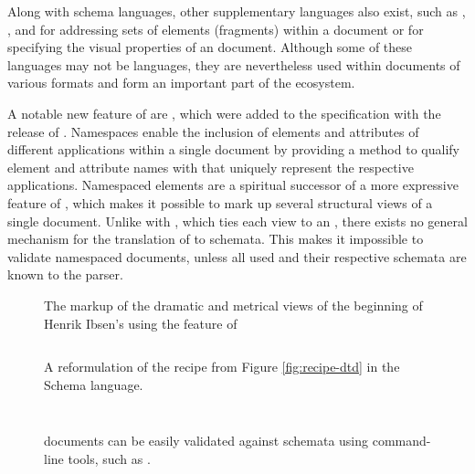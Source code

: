 \documentclass{book}
\begin{document}
Along with schema languages, other supplementary languages also exist, such as
, , and  for addressing sets of elements
(fragments) within a  document or  for specifying the
visual properties of an  document. Although some of these
languages may not be  languages, they are nevertheless used within
documents of various  formats and form an important part of the
ecosystem.

A notable new feature of  are %
, which were added to the specification with the
release of \cite{bray99}. Namespaces enable the inclusion of elements and
attributes of different  applications within a single 
document by providing a method to qualify element and attribute names with
 that uniquely represent the respective  applications.
Namespaced elements are a spiritual successor of a more expressive
 feature of , which makes it possible to
mark up several structural views of a single document. Unlike with
, which ties each view to an  ,
there exists no general mechanism for the translation of  to
 schemata.  This makes it impossible to validate namespaced
 documents, unless all used  and their respective
schemata are known to the parser.

\begin{figure}[hb!]
  
  \caption{The markup of the dramatic and metrical views of the beginning of
    Henrik Ibsen's  using the  feature of
    }
\end{figure}


\begin{figure}[H]
  \inputminted{xml}{examples/02/recipe.xsd}
  \caption{A reformulation of the recipe  from Figure
    \ref{fig:recipe-dtd} in the  Schema 
    language.}
  \label{fig:recipe-xsd}
  \inputminted{text}{examples/02/recipe.rnc}
  \caption{A reformulation of the recipe  from Figure
    \ref{fig:recipe-dtd} in the compact syntax of .%
    }
  \label{fig:recipe-rnc}
  \inputminted{sh}{examples/02/recipe.sh}
  \caption{ documents can be easily validated against 
    schemata using command-line tools, such as .}
\end{figure}
\end{document}
